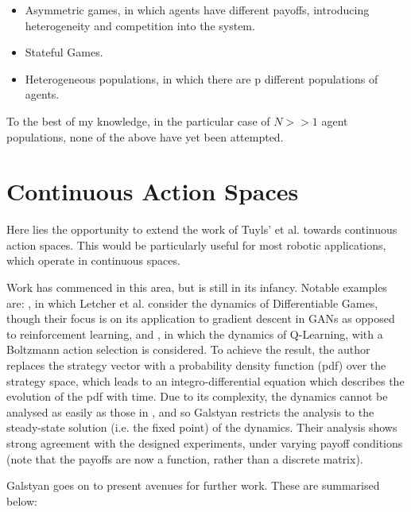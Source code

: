 \documentclass[../sample.tex]{subfiles}
\begin{document}
    \begin{itemize}
        \item Asymmetric games, in which agents have different payoffs, introducing heterogeneity
        and competition into the system.
        \item Stateful Games.
        \item Heterogeneous populations, in which there are p different populations of agents.
    \end{itemize}

    To the best of my knowledge, in the particular case of $N >> 1$ agent populations, none of the
    above have yet been attempted.

    \section{Continuous Action Spaces}

    Here lies the opportunity to extend the work of Tuyls' et al. \cite{Tuyls2006AnGames} towards
    continuous action spaces. This would be particularly useful for most robotic applications, which
    operate in continuous spaces. 

    Work has commenced in this area, but is still in its infancy. Notable examples are: 
    \cite{Letcher2019DifferentiableMechanics}, in which Letcher et al. consider the dynamics of
    Differentiable Games, though their focus is on its application to gradient descent in GANs as
    opposed to reinforcement learning, and \cite{Galstyan2013}, in which the dynamics of Q-Learning,
    with a Boltzmann action selection is considered. To achieve the result, the author replaces the
    strategy vector with a probability density function (pdf) over the strategy space, which leads
    to an integro-differential equation which describes the evolution of the pdf with time. Due to
    its complexity, the dynamics cannot be analysed as easily as those in \cite{Tuyls2006AnGames},
    and so Galstyan restricts the analysis to the steady-state solution (i.e. the fixed point) of
    the dynamics. Their analysis shows strong agreement with the designed experiments, under varying
    payoff conditions (note that the payoffs are now a function, rather than a discrete matrix).

    Galstyan goes on to present avenues for further work. These are summarised below:
\end{document}
